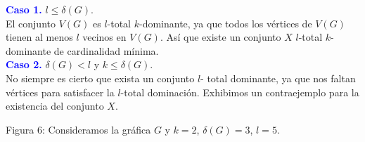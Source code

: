 \documentclass{article}
\begin{document}
\textcolor{blue}{\textbf{Caso 1.}} $l \le \delta(G)$.\\
El conjunto $V(G)$ es $l$-total $k$-dominante, ya que todos los vértices de $V(G)$ tienen al menos $l$ vecinos en $V(G)$. Así que existe un conjunto $X$ $l$-total $k$-dominante de cardinalidad mínima.\\


\textcolor{blue}{\textbf{Caso 2.}} $\delta(G) < l$ y $k \le \delta(G)$.\\
No siempre es cierto que exista un conjunto $l$- total dominante, ya que nos faltan vértices para satisfacer la $l$-total dominación. Exhibimos un contraejemplo para la existencia del conjunto $X$.


\begin{center}

\vspace{0.5cm}

Figura 6\vspace{0.5cm}: \small{Consideramos la gráfica $G$ y $k=2$, $\delta(G)=3$, $l=5$.}

\end{center}
\end{document}
